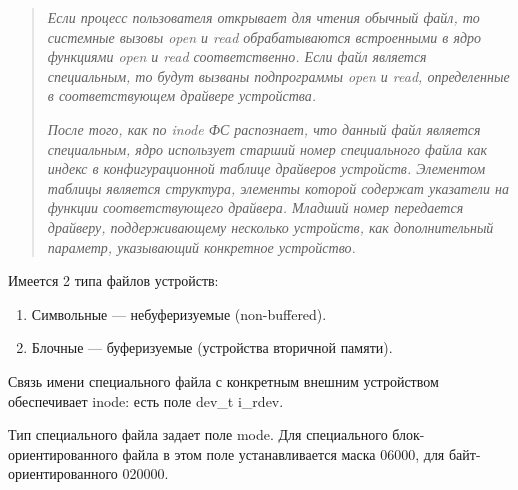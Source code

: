\begin{quote}
\textit{Если процесс пользователя открывает для чтения обычный файл, то системные вызовы open и read обрабатываются встроенными в ядро функциями open и read соответственно. Если файл является специальным, то будут вызваны подпрограммы open и read, определенные в соответствующем драйвере устройства.}

\textit{После того, как по inode ФС распознает, что данный файл является специальным, ядро использует старший номер специального файла как индекс в конфигурационной таблице драйверов устройств. Элементом таблицы является структура, элементы которой содержат указатели на функции соответствующего драйвера. Младший номер передается драйверу, поддерживающему несколько устройств, как дополнительный параметр, указывающий конкретное устройство.}
\end{quote}

Имеется 2 типа файлов устройств:
\begin{enumerate}
	\item Символьные --- небуферизуемые (non-buffered).
	\item Блочные --- буферизуемые (устройства вторичной памяти).
\end{enumerate}

Связь имени специального файла с конкретным внешним устройством обеспечивает inode: есть поле dev\_t i\_rdev.

Тип специального файла задает поле mode. Для специального блок-ориентированного файла в этом поле устанавливается маска 06000, для байт-ориентированного 020000.

